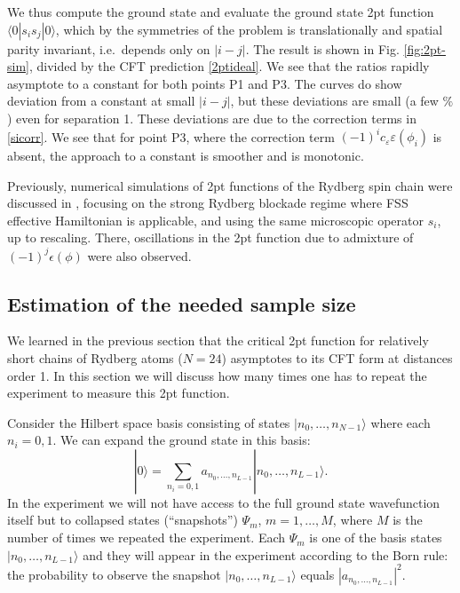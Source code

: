 \documentclass[a4paper,12pt]{article}
\theoremstyle{remark}
\theoremstyle{theorem}
\begin{document}
We thus compute the ground state and evaluate the ground state 2pt function $\langle 0| s_i s_j |0 \rangle$, which by the
symmetries of the problem is translationally and spatial parity invariant,
i.e.~depends only on $| i - j |$. The result is shown in Fig.
\ref{fig:2pt-sim}, divided by the CFT prediction \eqref{2ptideal}. We see that
the ratios rapidly asymptote to a constant for both points P1 and P3. The
curves do show deviation from a constant at small $| i - j |$, but these deviations are small (a few $\%$) even for separation 1. These
deviations are due to the correction terms in \eqref{sicorr}. We see that for
point P3, where the correction term $(- 1)^i c_{\varepsilon} \varepsilon
(\phi_i)$ is absent, the approach to a constant is smoother and is monotonic.


Previously, numerical simulations of 2pt functions of the Rydberg spin chain
were discussed in {\cite{Slagle:2021ene}}, focusing on the strong Rydberg
blockade regime where FSS effective Hamiltonian is applicable, and using the
same microscopic operator $s_i$, up to rescaling. There, oscillations in the
2pt function due to admixture of $(- 1)^j \epsilon (\phi)$ were also observed.

\subsection{Estimation of the needed sample size}\label{sec:estimation-of-the-needed-sample-size}

\label{sec:sample}We learned in the previous section that the critical 2pt
function for relatively short chains of Rydberg atoms ($N = 24$) asymptotes to
its CFT form at distances order 1. In this section we will discuss how many
times one has to repeat the experiment to measure this 2pt function.

Consider the Hilbert space basis consisting of states $|n_0, \ldots, n_{N - 1}
\rangle$ where each $n_i = 0, 1$. We can expand the ground state in this
basis:
\begin{equation}
	| 0 \rangle = \sum_{n_i = 0, 1} a_{n_0, \ldots, n_{L - 1}} |n_0, \ldots,
	n_{L - 1} \rangle .
\end{equation}
In the experiment we will not have access to the full ground state
wavefunction itself but to collapsed states (``snapshots'') $\Psi_m$, $m = 1,
\ldots, M$, where $M$ is the number of times we repeated the experiment. Each
$\Psi_m$ is one of the basis states $|n_0, \ldots, n_{L - 1} \rangle$ and they
will appear in the experiment according to the Born rule: the probability to
observe the snapshot $|n_0, \ldots, n_{L - 1} \rangle$ equals $|a_{n_0,
	\ldots, n_{L - 1}} |^2$.
\end{document}
